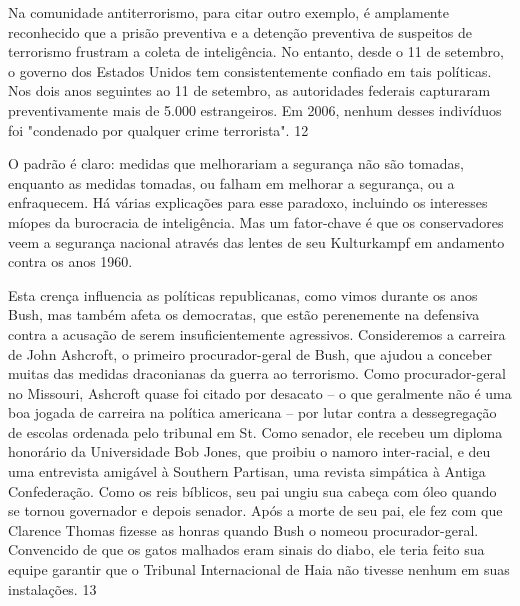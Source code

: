  
\par
 
Na comunidade antiterrorismo, para citar outro exemplo, é amplamente reconhecido que a prisão preventiva e a detenção preventiva de suspeitos de terrorismo frustram a coleta de inteligência. No entanto, desde o 11 de setembro, o governo dos Estados Unidos tem consistentemente confiado em tais políticas. Nos dois anos seguintes ao 11 de setembro, as autoridades federais capturaram preventivamente mais de 5.000 estrangeiros. Em 2006, nenhum desses indivíduos foi "condenado por qualquer crime terrorista".
 {\color{blue} 12}  

 
\par
 
O padrão é claro: medidas que melhorariam a segurança não são tomadas, enquanto as medidas tomadas, ou falham em melhorar a segurança, ou a enfraquecem. Há várias explicações para esse paradoxo, incluindo os interesses míopes da burocracia de inteligência. Mas um fator-chave é que os conservadores veem a segurança nacional através das lentes de seu Kulturkampf em andamento contra os anos 1960.
 
\par
 
Esta crença influencia as políticas republicanas, como vimos durante os anos Bush, mas também afeta os democratas, que estão perenemente na defensiva contra a acusação de serem insuficientemente agressivos. Consideremos a carreira de John Ashcroft, o primeiro procurador-geral de Bush, que ajudou a conceber muitas das medidas draconianas da guerra ao terrorismo. Como procurador-geral no Missouri, Ashcroft quase foi citado por desacato – o que geralmente não é uma boa jogada de carreira na política americana – por lutar contra a dessegregação de escolas ordenada pelo tribunal em St. Como senador, ele recebeu um diploma honorário da Universidade Bob Jones, que proibiu o namoro inter-racial, e deu uma entrevista amigável à Southern Partisan, uma revista simpática à Antiga Confederação. Como os reis bíblicos, seu pai ungiu sua cabeça com óleo quando se tornou governador e depois senador. Após a morte de seu pai, ele fez com que Clarence Thomas fizesse as honras quando Bush o nomeou procurador-geral. Convencido de que os gatos malhados eram sinais do diabo, ele teria feito sua equipe garantir que o Tribunal Internacional de Haia não tivesse nenhum em suas instalações.
 {\color{blue} 13}  

 
\par
 
